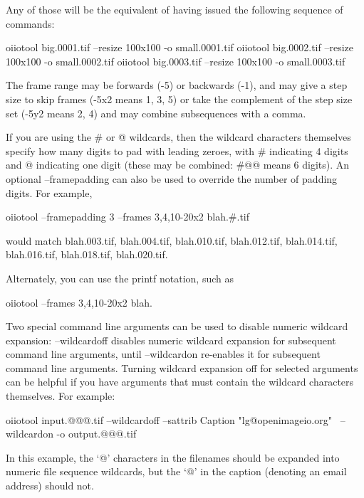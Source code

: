 \noindent Any of those will be the equivalent of having issued the following
sequence of commands:

\begin{code}
    oiiotool big.0001.tif --resize 100x100 -o small.0001.tif
    oiiotool big.0002.tif --resize 100x100 -o small.0002.tif
    oiiotool big.0003.tif --resize 100x100 -o small.0003.tif
\end{code}

The frame range may be forwards ({-5}) or backwards ({-1}),
and may give a step size to skip frames ({-5x2} means 1, 3, 5) or
take the complement of the step size set ({-5y2} means 2, 4) and
may combine subsequences with a comma.

If you are using the {\cf \#} or {\cf @} wildcards, then
the wildcard characters themselves specify how many digits to pad
with leading zeroes, with {\cf \#} indicating 4 digits and {\cf @}
indicating one digit (these may be combined: {\cf \#@@} means 6 digits).
An optional {\cf --framepadding} can also be used to override the number
of padding digits.
For example,
\begin{code}
    oiiotool --framepadding 3 --frames 3,4,10-20x2 blah.#.tif
\end{code}
\noindent would match {\cf blah.003.tif}, {\cf blah.004.tif},
{\cf blah.010.tif}, {\cf blah.012.tif}, 
{\cf blah.014.tif}, {\cf blah.016.tif}, {\cf blah.018.tif}, 
{\cf blah.020.tif}.

Alternately, you can use the {\cf printf} notation, such as
\begin{code}
    oiiotool --frames 3,4,10-20x2 blah.%
\end{code}

Two special command line arguments can be used to disable numeric wildcard
expansion: {\cf --wildcardoff} disables numeric wildcard expansion for
subsequent command line arguments, until {\cf --wildcardon} re-enables
it for subsequent command line arguments. Turning wildcard expansion off
for selected arguments can be helpful if you have arguments that must 
contain the wildcard characters themselves. For example:

\begin{code}
    oiiotool input.@@@.tif --wildcardoff --sattrib Caption "lg@openimageio.org" \
        --wildcardon -o output.@@@.tif
\end{code}

\noindent In this example, the `{\cf @}' characters in the filenames should
be expanded into numeric file sequence wildcards, but the `{\cf @}' in the
caption (denoting an email address) should not.

